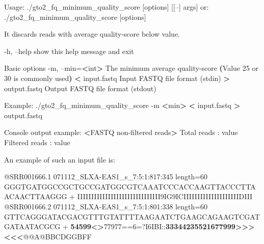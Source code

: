 \documentclass[11pt,]{krantz}
\newenvironment{Shaded}{\begin{snugshade}}{\end{snugshade}}
\newcommand{\KeywordTok}[1]{\textcolor[rgb]{0.27,0.27,0.27}{\textbf{#1}}}
\newcommand{\OperatorTok}[1]{\textcolor[rgb]{0.43,0.43,0.43}{\textbf{#1}}}
\newcommand{\ExtensionTok}[1]{#1}
\newcommand{\NormalTok}[1]{#1}
\begin{document}
\begin{Shaded}
\begin{Highlighting}[]
\ExtensionTok{Usage}\NormalTok{: ./gto2_fq_minimum_quality_score [options] [[--] args]}
   \ExtensionTok{or}\NormalTok{: ./gto2_fq_minimum_quality_score [options]}

\ExtensionTok{It}\NormalTok{ discards reads with average quality-score below value.}

    \ExtensionTok{-h}\NormalTok{, --help            show this help message and exit}

\ExtensionTok{Basic}\NormalTok{ options}
    \ExtensionTok{-m}\NormalTok{, --min=}\OperatorTok{<}\NormalTok{int}\OperatorTok{>}\NormalTok{       The minimum average quality-score }
                          \KeywordTok{(}\ExtensionTok{Value}\NormalTok{ 25 or 30 is commonly used}\KeywordTok{)}
    \OperatorTok{<} \ExtensionTok{input.fastq}\NormalTok{         Input FASTQ file format (stdin)}
    \OperatorTok{>} \ExtensionTok{output.fastq}\NormalTok{        Output FASTQ file format (stdout)}

\ExtensionTok{Example}\NormalTok{: ./gto2_fq_minimum_quality_score -m }\OperatorTok{<}\NormalTok{min}\OperatorTok{>} \OperatorTok{<} 
\ExtensionTok{input.fastq} \OperatorTok{>}\NormalTok{ output.fastq}

\ExtensionTok{Console}\NormalTok{ output example:}
\OperatorTok{<}\ExtensionTok{FASTQ}\NormalTok{ non-filtered reads}\OperatorTok{>}
\ExtensionTok{Total}\NormalTok{ reads    : value}
\ExtensionTok{Filtered}\NormalTok{ reads : value}
\end{Highlighting}
\end{Shaded}

An example of such an input file is:

\begin{Shaded}
\begin{Highlighting}[]
\ExtensionTok{@SRR001666.1}\NormalTok{ 071112_SLXA-EAS1_s_7:5:1:817:345 length=60}
\ExtensionTok{GGGTGATGGCCGCTGCCGATGGCGTCAAATCCCACCAAGTTACCCTTAACAACTTAAGGG}
\ExtensionTok{+}
\ExtensionTok{IIIIIIIIIIIIIIIIIIIIIIIIIIIIII9IG9ICIIIIIIIIIIIIIIIIIIIIDIII}
\ExtensionTok{@SRR001666.2}\NormalTok{ 071112_SLXA-EAS1_s_7:5:1:801:338 length=60}
\ExtensionTok{GTTCAGGGATACGACGTTTGTATTTTAAGAATCTGAAGCAGAAGTCGATGATAATACGCG}
\ExtensionTok{+}
\OperatorTok{54599<>}\ExtensionTok{77977}\NormalTok{==6=?I6IBI::}\OperatorTok{33344235521677999>>><<<}\NormalTok{@@A@BBCDGGBFF}
\end{Highlighting}
\end{Shaded}
\end{document}

